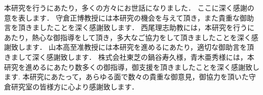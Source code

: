 \documentclass[master]{kuisthesis}		%
\begin{document}
\acknowledgments				%
	本研究を行うにあたり，多くの方々にお世話になりました．
	ここに深く感謝の意を表します．
 守倉正博教授には本研究の機会を与えて頂き，また貴重な御助言を頂きましたことを深く感謝致します．
 西尾理志助教には，本研究を行うにあたり，熱心な御指導をして頂き，多大なご協力をして頂きましたことを深く感謝致します．
 山本高至准教授には本研究を進めるにあたり，適切な御助言を頂きまして深く感謝致します．
 株式会社東芝の鍋谷寿久様，青木亜秀様には，本研究を進めるにあたり数多くの御指導，御支援を頂きましたことを深く感謝致します.
 本研究にあたって，あらゆる面で数々の貴重な御意見，御協力を頂いた守倉研究室の皆様方に心より感謝致します．

\end{document}
